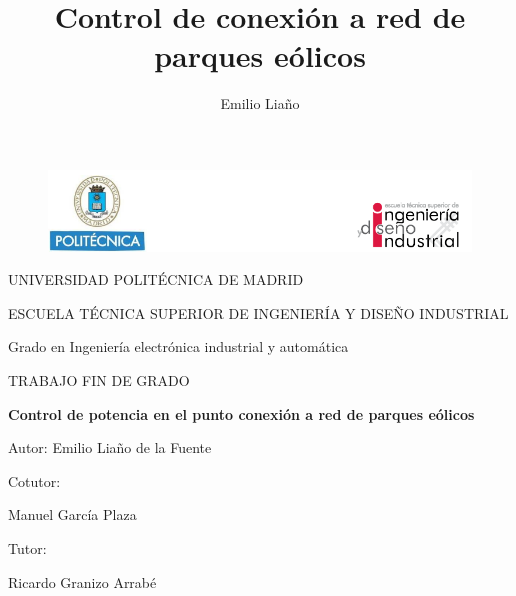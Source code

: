 \documentclass{book}
\title{Control de conexi\'on a red de parques e\'olicos}
\date{}
\author{Emilio Lia\~no}
\begin{document}
\begin{figure}[h!]
\centering
\includegraphics[width=\textwidth]{Encabezado.PNG}
\end{figure}
\begin{center}
	\LARGE
	UNIVERSIDAD POLIT\'ECNICA DE MADRID \par
	\vspace {10 mm}
	ESCUELA T\'ECNICA SUPERIOR DE INGENIER\'IA Y DISEÑO INDUSTRIAL\par
	\vspace {10 mm}
	\LARGE
	Grado en Ingenier\'ia electr\'onica industrial y autom\'atica \par
	\vspace {10 mm}
	\Huge
	TRABAJO FIN DE GRADO \par
	\vspace{20 mm}
	\LARGE
	\textbf{Control de potencia en el punto conexi\'on a red de parques e\'olicos}\par
	\vspace {10 mm}
	Autor: Emilio Liaño de la Fuente \par
	\vspace {10 mm}
\end{center}
\begin{multicols}{2}
	\LARGE
	Cotutor:

	Manuel Garc\'ia Plaza \par
	Tutor:

	Ricardo Granizo Arrab\'e
\vfill
		
\end{multicols}
\end{document}
